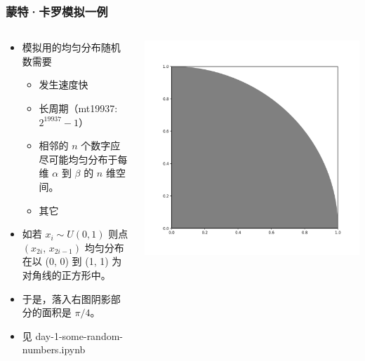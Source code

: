 \documentclass[serif,aspectratio=169]{beamer}
\begin{document}
\begin{frame}
  \frametitle{蒙特·卡罗模拟一例}
  \begin{columns}
    \begin{column}{.5\textwidth}
      \begin{itemize}
      \item 模拟用的均匀分布随机数需要
        \begin{itemize}
        \item 发生速度快
        \item 长周期（mt19937: $2^{19937}-1$）
        \item 相邻的 $n$ 个数字应尽可能均匀分布于每维 $\alpha$ 到 $\beta$ 的 $n$ 维空间。
        \item 其它
        \end{itemize}
      \item 如若 $x_i\sim U(0,1)$ 则点 $(x_{2i},\,x_{2i-1})$ 均匀分布在以 (0, 0) 到 (1, 1) 为对角线的正方形中。
      \item 于是，落入右图阴影部分的面积是 $\pi/4$。
      \item 见 {\small\color{cyan}day-1-some-random-numbers.ipynb}
      \end{itemize}
    \end{column}
    \begin{column}{.5\textwidth}
      \includegraphics[width=\textwidth]{img/quarterCircle.png}
    \end{column}
  \end{columns}
\end{frame}
\end{document}
